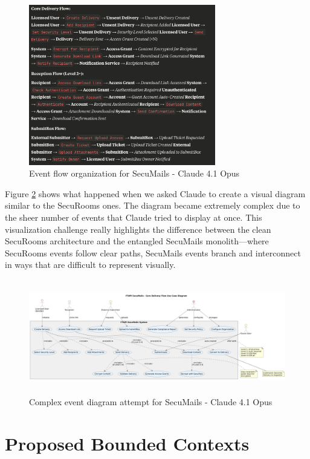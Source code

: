   \begin{figure}[htbp]
    \centering
    \includegraphics[height=7cm]{figures/secumails-claude-event-storming-2.png} 
    \caption{Event flow organization for SecuMails - Claude 4.1 Opus}
    \label{fig:event-stormin-secumails-2} 
  \end{figure}
  
  Figure \ref{fig:diagram-event-storming-claude-1} shows what happened when we asked Claude to create a visual diagram similar to the SecuRooms ones. The diagram became extremely complex due to the sheer number of events that Claude tried to display at once. This visualization challenge really highlights the difference between the clean SecuRooms architecture and the entangled SecuMails monolith—where SecuRooms events follow clear paths, SecuMails events branch and interconnect in ways that are difficult to represent visually.
  
  \begin{figure}[htbp]
    \centering
    \includegraphics[height=5cm]{figures/diagram-secumail-event-1.png} 
    \caption{Complex event diagram attempt for SecuMails - Claude 4.1 Opus}
    \label{fig:diagram-event-storming-claude-1} 
  \end{figure}

\section{Proposed Bounded Contexts}

